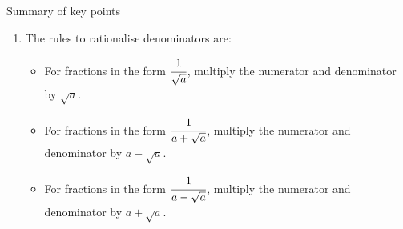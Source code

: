 \documentclass[fleqn]{article}
\begin{document}
\begin{mybox2}[colbacktitle=green]{Summary of key points}
\begin{enumerate}
\begin{multicols}{2}
				\columnbreak
				\begin{itemize}
					\item[] $\sqrt{\cfrac{a}{b}}=\dfrac{\sqrt{a}}{\sqrt{b}}$
				\end{itemize}
			\end{multicols}
		\item The rules to rationalise denominators are:\vspace{-2mm}
		\begin{itemize}
			\setlength{\itemsep}{-3pt}
			\item For fractions in the form $\cfrac{1}{\sqrt{a}}$, multiply the numerator and denominator by $\sqrt{a}$.
			\item For fractions in the form $\cfrac{1}{a+\sqrt{a}}$, multiply the numerator and denominator by $a-\sqrt{a}$.
			\item For fractions in the form $\cfrac{1}{a-\sqrt{a}}$, multiply the numerator and denominator by $a+\sqrt{a}$.
		\end{itemize}
	\end{enumerate}
\end{mybox2}
\newpage
\end{document}

